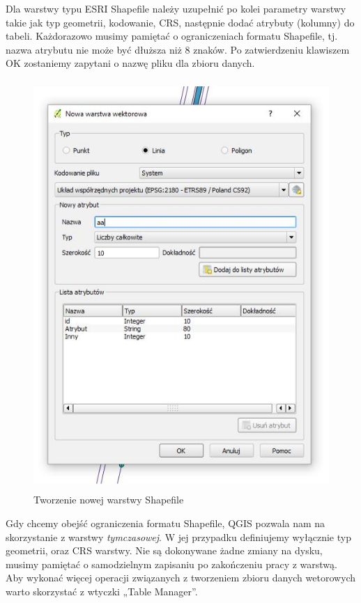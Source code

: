 \documentclass[12pt,a4paper]{book}
\begin{document}
Dla warstwy typu ESRI Shapefile należy uzupełnić po kolei parametry warstwy takie jak typ geometrii, kodowanie, CRS, następnie dodać atrybuty (kolumny) do tabeli. Każdorazowo musimy pamiętać o ograniczeniach formatu Shapefile, tj. nazwa atrybutu nie może być dłuższa niż 8 znaków. Po zatwierdzeniu klawiszem OK zostaniemy zapytani o nazwę pliku dla zbioru danych.

\begin{center}
\begin{figure}
\includegraphics[width=11.599cm,height=15.579cm]{002-nowy-wektor.jpg}
\caption{Tworzenie nowej warstwy Shapefile}
\end{figure}
\end{center}
Gdy chcemy obejść ograniczenia formatu Shapefile, QGIS pozwala nam na skorzystanie z warstwy \textit{tymczasowej}. W jej przypadku definiujemy wyłącznie typ geometrii, oraz CRS warstwy. Nie są dokonywane żadne zmiany na dysku, musimy pamiętać o samodzielnym zapisaniu po zakończeniu pracy z warstwą. Aby wykonać więcej  operacji związanych z tworzeniem zbioru danych wetorowych warto skorzystać z wtyczki „Table Manager”.
\end{document}
